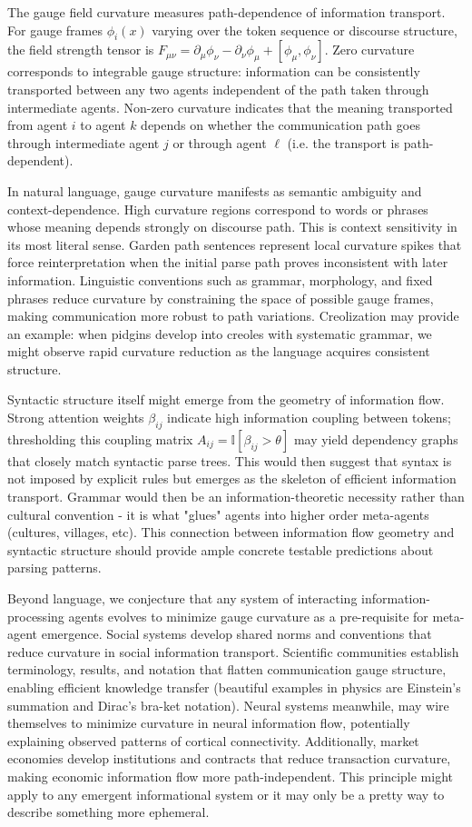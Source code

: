 \documentclass[11pt]{article}
\begin{document}
The gauge field curvature measures path-dependence of information transport. For gauge frames $\phi_i(x)$ varying over the token sequence or discourse structure, the field strength tensor is $F_{\mu\nu} = \partial_\mu \phi_\nu - \partial_\nu \phi_\mu + [\phi_\mu, \phi_\nu]$. Zero curvature corresponds to integrable gauge structure: information can be consistently transported between any two agents independent of the path taken through intermediate agents. Non-zero curvature indicates that the meaning transported from agent $i$ to agent $k$ depends on whether the communication path goes through intermediate agent $j$ or through agent $\ell$ (i.e. the transport is path-dependent).

In natural language, gauge curvature manifests as semantic ambiguity and context-dependence. High curvature regions correspond to words or phrases whose meaning depends strongly on discourse path. This is context sensitivity in its most literal sense. Garden path sentences represent local curvature spikes that force reinterpretation when the initial parse path proves inconsistent with later information. Linguistic conventions such as grammar, morphology, and fixed phrases reduce curvature by constraining the space of possible gauge frames, making communication more robust to path variations. Creolization may provide an example: when pidgins develop into creoles with systematic grammar, we might observe rapid curvature reduction as the language acquires consistent structure.

Syntactic structure itself might emerge from the geometry of information flow. Strong attention weights $\beta_{ij}$ indicate high information coupling between tokens; thresholding this coupling matrix $A_{ij} = \mathbb{I}[\beta_{ij} > \theta]$ may yield dependency graphs that closely match syntactic parse trees. This would then suggest that syntax is not imposed by explicit rules but emerges as the skeleton of efficient information transport.  Grammar would then be an information-theoretic necessity rather than cultural convention - it is what "glues" agents into higher order meta-agents (cultures, villages, etc). This connection between information flow geometry and syntactic structure should provide ample concrete testable predictions about parsing patterns.

Beyond language, we conjecture that any system of interacting information-processing agents evolves to minimize gauge curvature as a pre-requisite for meta-agent emergence. Social systems develop shared norms and conventions that reduce curvature in social information transport. Scientific communities establish terminology, results, and notation that flatten communication gauge structure, enabling efficient knowledge transfer (beautiful examples in physics are Einstein's summation and Dirac's bra-ket notation). Neural systems meanwhile, may wire themselves to minimize curvature in neural information flow, potentially explaining observed patterns of cortical connectivity. Additionally, market economies develop institutions and contracts that reduce transaction curvature, making economic information flow more path-independent.  This principle might apply to any emergent informational system or it may only be a pretty way to describe something more ephemeral.
\end{document}
